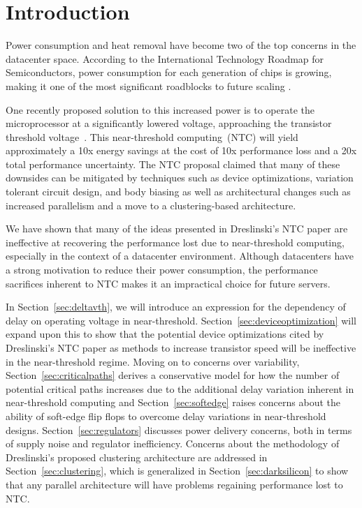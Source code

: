 \section{Introduction}
\label{sec:intro}

Power consumption and heat removal have become two of the top concerns in the datacenter space\cite{EPA_2007}. 
According to the International Technology Roadmap for Semiconductors, power consumption for each generation of chips is growing, making it one of the most significant roadblocks to future scaling \cite{Devised_2009}. 

One recently proposed  solution to this increased power is to operate the microprocessor at a significantly lowered voltage, approaching the transistor threshold voltage~\cite{Dreslinski:2010ez}. 
This near-threshold computing~(NTC) will yield approximately a 10x energy savings at the cost of 10x performance loss and a 20x total performance uncertainty. 
The NTC proposal claimed that many of these downsides can be mitigated by techniques such as device optimizations, variation tolerant circuit design, and body biasing as well as architectural changes such as increased parallelism and a move to a clustering-based architecture.

We have shown that many of the ideas presented in Dreslinski's NTC paper \cite{Dreslinski:2010ez} are ineffective at recovering the performance lost due to near-threshold computing, especially in the context of a datacenter environment. 
Although datacenters have a strong motivation to reduce their power consumption, the performance sacrifices inherent to NTC makes it an impractical choice for future servers.

In Section~\ref{sec:deltavth}, we will introduce an expression for the dependency of delay on operating voltage in near-threshold.
Section~\ref{sec:deviceoptimization} will expand upon this to show that the potential device optimizations cited by Dreslinski's NTC paper as methods to increase transistor speed will be ineffective in the near-threshold regime.
Moving on to concerns over variability, Section~\ref{sec:criticalpaths} derives a conservative model for how the number of potential critical paths increases due to the additional delay variation inherent in near-threshold computing and Section~\ref{sec:softedge} raises concerns about the ability of soft-edge flip flops to overcome delay variations in near-threshold designs.
Section~\ref{sec:regulators} discusses power delivery concerns, both in terms of supply noise and regulator inefficiency. 
Concerns about the methodology of Dreslinski's proposed clustering architecture are addressed in Section~\ref{sec:clustering}, which is generalized in Section~\ref{sec:darksilicon} to show that any parallel architecture will have problems regaining performance lost to NTC.

